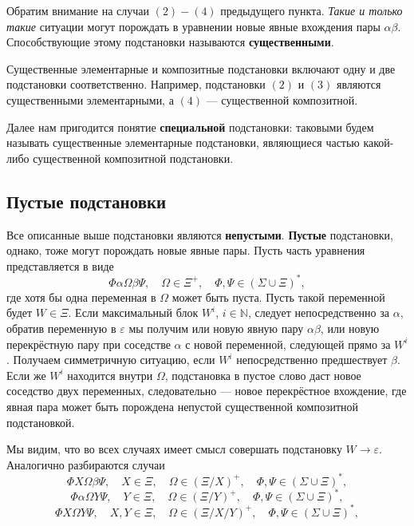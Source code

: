 \documentclass[12pt]{article}
\begin{document}
Обратим внимание на случаи $(2)-(4)$ предыдущего пункта. \textit{Такие и только
такие} ситуации могут порождать в уравнении новые явные вхождения пары
$\alpha \beta$. Способствующие этому подстановки называются
\textbf{существенными}.

Существенные элементарные и композитные подстановки включают одну и две
подстановки соответственно. Например, подстановки $(2)$ и $(3)$ являются
существенными элементарными, а $(4)$ --- существенной композитной.

Далее нам пригодится понятие \textbf{специальной} подстановки: таковыми будем
называть существенные элементарные подстановки, являющиеся частью какой-либо
существенной композитной подстановки.

\subsection{Пустые подстановки}

Все описанные выше подстановки являются \textbf{непустыми}. \textbf{Пустые}
подстановки, однако, тоже могут порождать новые явные пары. Пусть часть
уравнения представляется в виде
\begin{equation}
  \Phi \alpha \Omega \beta \Psi, \quad \Omega \in \Xi^+, \quad \Phi, \Psi \in
  (\Sigma \cup \Xi)^*,
\end{equation}
где хотя бы одна переменная в $\Omega$ может быть пуста. Пусть такой переменной
будет $W \in \Xi$. Если максимальный блок $W^i$, $i \in \mathbb{N}$, следует
непосредственно за $\alpha$, обратив переменную в $\varepsilon$ мы получим или
новую явную пару $\alpha \beta$, или новую перекрёстную пару при соседстве
$\alpha$ с новой переменной, следующей прямо за $W^i$. Получаем симметричную
ситуацию, если $W^i$ непосредственно предшествует $\beta$. Если же $W^i$
находится внутри $\Omega$, подстановка в пустое слово даст новое соседство двух
переменных, следовательно --- новое перекрёстное вхождение, где явная пара
может быть порождена непустой существенной композитной подстановкой.

Мы видим, что во всех случаях имеет смысл совершать подстановку $W \to
\varepsilon$. Аналогично разбираются случаи
\begin{equation}
  \Phi X \Omega \beta \Psi, \quad X \in \Xi, \quad \Omega \in (\Xi / X)^+,
  \quad \Phi, \Psi \in (\Sigma \cup \Xi)^*,
\end{equation}
\begin{equation}
  \Phi \alpha \Omega Y \Psi, \quad Y \in \Xi, \quad \Omega \in (\Xi / Y)^+,
  \quad \Phi, \Psi \in (\Sigma \cup \Xi)^*,
\end{equation}
\begin{equation}
  \Phi X \Omega Y \Psi, \quad X, Y \in \Xi, \quad \Omega \in (\Xi / X / Y)^+,
  \quad \Phi, \Psi \in (\Sigma \cup \Xi)^*,
\end{equation}
\end{document}
